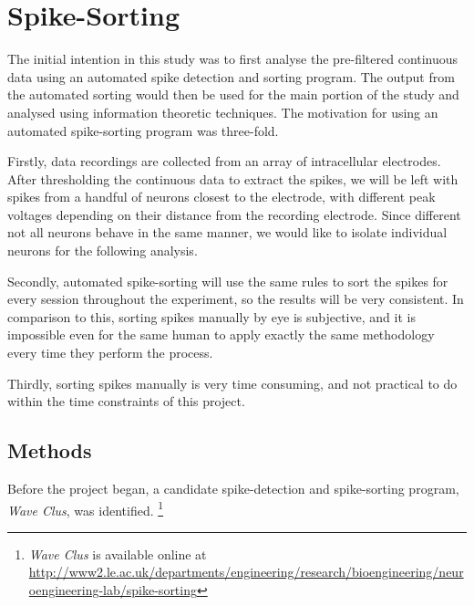 \chapter{Spike-Sorting}
\label{sec:sorting}

The initial intention in this study was to first analyse the pre-filtered continuous data using an automated spike detection and sorting program. The output from the automated sorting would then be used for the main portion of the study and analysed using information theoretic techniques.
The motivation for using an automated spike-sorting program was three-fold.

Firstly, data recordings are collected from an array of intracellular electrodes. After thresholding the continuous data to extract the spikes, we will be left with spikes from a handful of neurons closest to the electrode, with different peak voltages depending on their distance from the recording electrode. Since different not all neurons behave in the same manner, we would like to isolate individual neurons for the following analysis.

Secondly, automated spike-sorting will use the same rules to sort the spikes for every session throughout the experiment, so the results will be very consistent. In comparison to this, sorting spikes manually by eye is subjective, and it is impossible even for the same human to apply exactly the same methodology every time they perform the process.

Thirdly, sorting spikes manually is very time consuming, and not practical to do within the time constraints of this project.

\section{Methods}

Before the project began, a candidate spike-detection and spike-sorting program, \textit{Wave Clus}, was identified.%
\footnote{
\textit{Wave Clus} is available online at
\url{http://www2.le.ac.uk/departments/engineering/research/bioengineering/neuroengineering-lab/spike-sorting}
}

